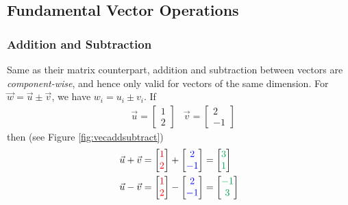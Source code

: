 \subsection{Fundamental Vector Operations}
\label{section:vectoraddmul}
\subsubsection{Addition and Subtraction}
Same as their matrix counterpart, addition and subtraction between vectors are \textit{component-wise}, and hence only valid for vectors of the same dimension. For $\vec{w} = \vec{u} \pm \vec{v}$, we have $w_i = u_i \pm v_i$. If
\begin{align*}
&\vec{u} =
\begin{bmatrix}
1 \\
2
\end{bmatrix}
&
\vec{v} =
\begin{bmatrix}
2 \\
-1
\end{bmatrix}
\end{align*}
then (see Figure \ref{fig:vecaddsubtract})
\begin{align*}
\vec{u} + \vec{v} =
\begin{bmatrix}
\textcolor{red}{1} \\
\textcolor{red}{2}
\end{bmatrix}
+
\begin{bmatrix}
\textcolor{blue}{2} \\
\textcolor{blue}{-1}
\end{bmatrix}
&= 
\begin{bmatrix}
\textcolor{Green}{3} \\
\textcolor{Green}{1}
\end{bmatrix}
\\
\vec{u} - \vec{v} =
\begin{bmatrix}
\textcolor{red}{1} \\
\textcolor{red}{2}
\end{bmatrix}
-
\begin{bmatrix}
\textcolor{blue}{2} \\
\textcolor{blue}{-1}
\end{bmatrix}
&= 
\begin{bmatrix}
\textcolor{Green}{-1} \\
\textcolor{Green}{3}
\end{bmatrix}
\end{align*}
